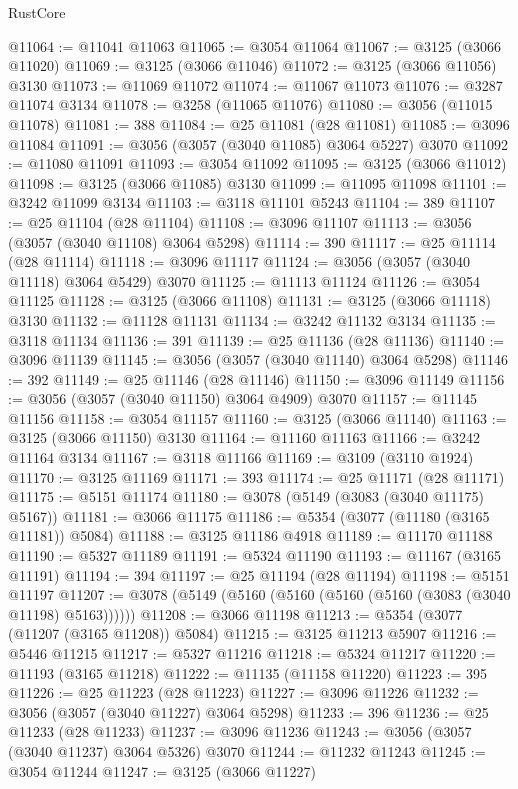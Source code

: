 \begin{lexlean}{RustCore}
\begin{coremodule}
@11064 := @11041 @11063
@11065 := @3054 @11064
@11067 := @3125 (@3066 @11020)
@11069 := @3125 (@3066 @11046)
@11072 := @3125 (@3066 @11056) @3130
@11073 := @11069 @11072
@11074 := @11067 @11073
@11076 := @3287 @11074 @3134
@11078 := @3258 (@11065 @11076)
@11080 := @3056 (@11015 @11078)
@11081 := 388
@11084 := @25 @11081 (@28 @11081)
@11085 := @3096 @11084
@11091 := @3056 (@3057 (@3040 @11085) @3064 @5227) @3070
@11092 := @11080 @11091
@11093 := @3054 @11092
@11095 := @3125 (@3066 @11012)
@11098 := @3125 (@3066 @11085) @3130
@11099 := @11095 @11098
@11101 := @3242 @11099 @3134
@11103 := @3118 @11101 @5243
@11104 := 389
@11107 := @25 @11104 (@28 @11104)
@11108 := @3096 @11107
@11113 := @3056 (@3057 (@3040 @11108) @3064 @5298)
@11114 := 390
@11117 := @25 @11114 (@28 @11114)
@11118 := @3096 @11117
@11124 := @3056 (@3057 (@3040 @11118) @3064 @5429) @3070
@11125 := @11113 @11124
@11126 := @3054 @11125
@11128 := @3125 (@3066 @11108)
@11131 := @3125 (@3066 @11118) @3130
@11132 := @11128 @11131
@11134 := @3242 @11132 @3134
@11135 := @3118 @11134
@11136 := 391
@11139 := @25 @11136 (@28 @11136)
@11140 := @3096 @11139
@11145 := @3056 (@3057 (@3040 @11140) @3064 @5298)
@11146 := 392
@11149 := @25 @11146 (@28 @11146)
@11150 := @3096 @11149
@11156 := @3056 (@3057 (@3040 @11150) @3064 @4909) @3070
@11157 := @11145 @11156
@11158 := @3054 @11157
@11160 := @3125 (@3066 @11140)
@11163 := @3125 (@3066 @11150) @3130
@11164 := @11160 @11163
@11166 := @3242 @11164 @3134
@11167 := @3118 @11166
@11169 := @3109 (@3110 @1924)
@11170 := @3125 @11169
@11171 := 393
@11174 := @25 @11171 (@28 @11171)
@11175 := @5151 @11174
@11180 := @3078 (@5149 (@3083 (@3040 @11175) @5167))
@11181 := @3066 @11175
@11186 := @5354 (@3077 (@11180 (@3165 @11181)) @5084)
@11188 := @3125 @11186 @4918
@11189 := @11170 @11188
@11190 := @5327 @11189
@11191 := @5324 @11190
@11193 := @11167 (@3165 @11191)
@11194 := 394
@11197 := @25 @11194 (@28 @11194)
@11198 := @5151 @11197
@11207 := @3078 (@5149 (@5160 (@5160 (@5160 (@5160 (@3083 (@3040 @11198) @5163))))))
@11208 := @3066 @11198
@11213 := @5354 (@3077 (@11207 (@3165 @11208)) @5084)
@11215 := @3125 @11213 @5907
@11216 := @5446 @11215
@11217 := @5327 @11216
@11218 := @5324 @11217
@11220 := @11193 (@3165 @11218)
@11222 := @11135 (@11158 @11220)
@11223 := 395
@11226 := @25 @11223 (@28 @11223)
@11227 := @3096 @11226
@11232 := @3056 (@3057 (@3040 @11227) @3064 @5298)
@11233 := 396
@11236 := @25 @11233 (@28 @11233)
@11237 := @3096 @11236
@11243 := @3056 (@3057 (@3040 @11237) @3064 @5326) @3070
@11244 := @11232 @11243
@11245 := @3054 @11244
@11247 := @3125 (@3066 @11227)

\end{coremodule}
\end{lexlean}
